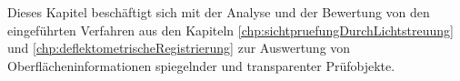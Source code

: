 Dieses Kapitel beschäftigt sich mit der Analyse und der Bewertung von den eingeführten Verfahren aus den Kapiteln \ref{chp:sichtpruefungDurchLichtstreuung} und \ref{chp:deflektometrischeRegistrierung} zur Auswertung von Oberflächeninformationen spiegelnder und transparenter Prüfobjekte.